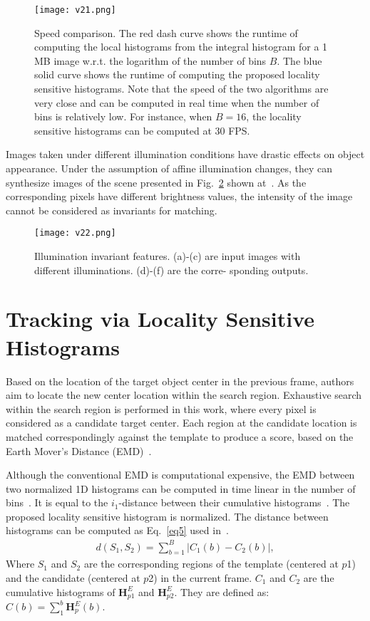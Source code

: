 \documentclass[10pt,twocolumn,letterpaper]{article}
\begin{document}
\begin{figure}[t]
\begin{center}
\texttt{[image: v21.png]}
\end{center}
\caption{Speed comparison. The red dash curve shows the runtime of computing the local histograms from the integral histogram for a 1 MB image w.r.t. the logarithm of the number of bins $B$. The blue solid curve shows the runtime of computing the proposed locality sensitive histograms. Note that the speed of the two algorithms are very close and can be computed in real time when the number of bins is relatively low. For instance, when $B = 16$, the locality sensitive histograms can be computed at 30 FPS.}
\label{fig}
\end{figure}

Images taken under different illumination conditions have drastic effects on object appearance. Under the assumption of affine illumination changes, they can synthesize images of the scene presented in Fig.~\ref{fig2} shown at~\cite{via}. As the corresponding pixels have different brightness values, the intensity of the image cannot be considered as invariants for matching.

\begin{figure}[t]
\begin{center}
\texttt{[image: v22.png]}
\end{center}
\caption{Illumination invariant features. (a)-(c) are input images with different illuminations. (d)-(f) are the corre- sponding outputs.}
\label{fig2}
\end{figure}

\balance
\section{Tracking via Locality Sensitive Histograms}

Based on the location of the target object center in the previous frame, authors aim to locate the new center location within the search region. Exhaustive search within the search region is performed in this work, where every pixel is considered as a candidate target center. Each region at the candidate location is matched correspondingly against the template to produce a score, based on the Earth Mover's Distance (EMD)~\cite{The}.

Although the conventional EMD is computational expensive, the EMD between two normalized 1D histograms can be computed in time linear in the number of bins~\cite{Approximate}. It is equal to the $i_1$-distance between their cumulative histograms~\cite{A}. The proposed locality sensitive histogram is normalized. The distance between histograms can be computed as Eq.~\ref{eq5} used in~\cite{via}.\\
\begin{gather*}
d(S_1,S_2) = \sum_{b=1}^B|C_1(b) - C_2(b)|,
\tag{5}
\label{eq5}
\end{gather*}
Where $S_1$ and $S_2$ are the corresponding regions of the template (centered at $p$1) and the candidate (centered at $p$2) in the current frame. $C_1$ and $C_2$ are the cumulative histograms of $\mathbf{H}_{p1}^E$ and $\mathbf{H}_{p2}^E$. They are defined as: $C(b) = \sum_1^b\mathbf{H}_p^E(b)$.

{\small


}
\end{document}
